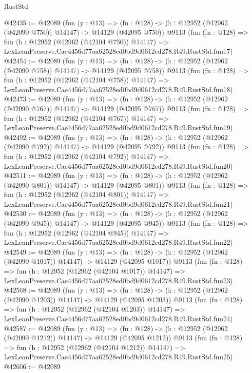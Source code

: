 \begin{lexlean}{RustStd}
\begin{coremodule}
@42435 := @42089
    (fun (y : @13) =>
    (fn : @128) -> (h : @12952 (@12962 (@42090 @750)) @14147) -> @14129 (@42095 @750))
    @9113
    (fun (fn : @128) =>
    fun (h : @12952 (@12962 (@42104 @750)) @14147) =>
    LexLeanPreserve.Cae4456d77aa62528ed0bd9d0612cd278.R49.RustStd.fun17)
@42454 := @42089
    (fun (y : @13) =>
    (fn : @128) -> (h : @12952 (@12962 (@42090 @758)) @14147) -> @14129 (@42095 @758))
    @9113
    (fun (fn : @128) =>
    fun (h : @12952 (@12962 (@42104 @758)) @14147) =>
    LexLeanPreserve.Cae4456d77aa62528ed0bd9d0612cd278.R49.RustStd.fun18)
@42473 := @42089
    (fun (y : @13) =>
    (fn : @128) -> (h : @12952 (@12962 (@42090 @767)) @14147) -> @14129 (@42095 @767))
    @9113
    (fun (fn : @128) =>
    fun (h : @12952 (@12962 (@42104 @767)) @14147) =>
    LexLeanPreserve.Cae4456d77aa62528ed0bd9d0612cd278.R49.RustStd.fun19)
@42492 := @42089
    (fun (y : @13) =>
    (fn : @128) -> (h : @12952 (@12962 (@42090 @792)) @14147) -> @14129 (@42095 @792))
    @9113
    (fun (fn : @128) =>
    fun (h : @12952 (@12962 (@42104 @792)) @14147) =>
    LexLeanPreserve.Cae4456d77aa62528ed0bd9d0612cd278.R49.RustStd.fun20)
@42511 := @42089
    (fun (y : @13) =>
    (fn : @128) -> (h : @12952 (@12962 (@42090 @801)) @14147) -> @14129 (@42095 @801))
    @9113
    (fun (fn : @128) =>
    fun (h : @12952 (@12962 (@42104 @801)) @14147) =>
    LexLeanPreserve.Cae4456d77aa62528ed0bd9d0612cd278.R49.RustStd.fun21)
@42530 := @42089
    (fun (y : @13) =>
    (fn : @128) -> (h : @12952 (@12962 (@42090 @945)) @14147) -> @14129 (@42095 @945))
    @9113
    (fun (fn : @128) =>
    fun (h : @12952 (@12962 (@42104 @945)) @14147) =>
    LexLeanPreserve.Cae4456d77aa62528ed0bd9d0612cd278.R49.RustStd.fun22)
@42549 := @42089
    (fun (y : @13) =>
    (fn : @128) -> (h : @12952 (@12962 (@42090 @1017)) @14147) -> @14129 (@42095 @1017))
    @9113
    (fun (fn : @128) =>
    fun (h : @12952 (@12962 (@42104 @1017)) @14147) =>
    LexLeanPreserve.Cae4456d77aa62528ed0bd9d0612cd278.R49.RustStd.fun23)
@42568 := @42089
    (fun (y : @13) =>
    (fn : @128) -> (h : @12952 (@12962 (@42090 @1203)) @14147) -> @14129 (@42095 @1203))
    @9113
    (fun (fn : @128) =>
    fun (h : @12952 (@12962 (@42104 @1203)) @14147) =>
    LexLeanPreserve.Cae4456d77aa62528ed0bd9d0612cd278.R49.RustStd.fun24)
@42587 := @42089
    (fun (y : @13) =>
    (fn : @128) -> (h : @12952 (@12962 (@42090 @1212)) @14147) -> @14129 (@42095 @1212))
    @9113
    (fun (fn : @128) =>
    fun (h : @12952 (@12962 (@42104 @1212)) @14147) =>
    LexLeanPreserve.Cae4456d77aa62528ed0bd9d0612cd278.R49.RustStd.fun25)
@42606 := @42089

\end{coremodule}
\end{lexlean}
